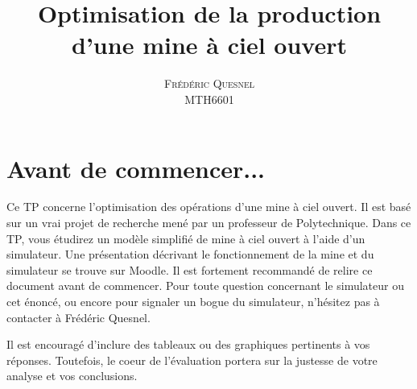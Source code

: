 \documentclass[letterpaper,12pt]{article}
\title{ Optimisation de la production d'une mine à ciel ouvert }
\author{\textsc{\large{Frédéric Quesnel}} \\ MTH6601}
\begin{document}
	
	\maketitle
	
	\tableofcontents
	
	\setcounter{section}{-1}
	
	\section{Avant de commencer...}
	Ce TP concerne l'optimisation des opérations d'une mine à ciel ouvert. Il est basé sur un vrai projet de recherche mené par un professeur de Polytechnique. Dans ce TP, vous étudirez un modèle simplifié de mine à ciel ouvert à l'aide d'un simulateur. Une présentation décrivant le fonctionnement de la mine et du simulateur se trouve sur Moodle. Il est fortement recommandé de relire ce document avant de commencer. Pour toute question concernant le simulateur ou cet énoncé, ou encore pour signaler un bogue du simulateur, n'hésitez pas à contacter à Frédéric Quesnel. 
	
	
	Il est encouragé d'inclure des tableaux ou des graphiques pertinents à vos réponses. Toutefois, le coeur de l'évaluation portera sur la justesse de votre analyse et vos conclusions. 
	
	
		
	

	
	

	
	
	
	
\end{document}

